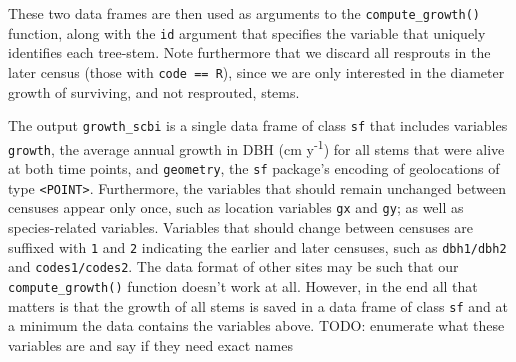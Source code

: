 \documentclass[12pt]{article}
\newenvironment{Shaded}{\begin{snugshade}}{\end{snugshade}}
\newcommand{\CommentTok}[1]{\textcolor[rgb]{0.56,0.35,0.01}{\textit{#1}}}
\newcommand{\DataTypeTok}[1]{\textcolor[rgb]{0.13,0.29,0.53}{#1}}
\newcommand{\DecValTok}[1]{\textcolor[rgb]{0.00,0.00,0.81}{#1}}
\newcommand{\KeywordTok}[1]{\textcolor[rgb]{0.13,0.29,0.53}{\textbf{#1}}}
\newcommand{\NormalTok}[1]{#1}
\newcommand{\OperatorTok}[1]{\textcolor[rgb]{0.81,0.36,0.00}{\textbf{#1}}}
\newcommand{\StringTok}[1]{\textcolor[rgb]{0.31,0.60,0.02}{#1}}
\begin{document}
These two data frames are then used as arguments to the
\texttt{compute\_growth()} function, along with the \texttt{id} argument
that specifies the variable that uniquely identifies each tree-stem.
Note furthermore that we discard all resprouts in the later census
(those with \texttt{code\ ==\ R}), since we are only interested in the
diameter growth of surviving, and not resprouted, stems.

\begin{Shaded}
\end{Shaded}

The output \texttt{growth\_scbi} is a single data frame of class
\texttt{sf} that includes variables \texttt{growth}, the average annual
growth in DBH (cm y\textsuperscript{-1}) for all stems that were alive
at both time points, and \texttt{geometry}, the \texttt{sf} package's
encoding of geolocations of type
\texttt{\textless{}POINT\textgreater{}}. Furthermore, the variables that
should remain unchanged between censuses appear only once, such as
location variables \texttt{gx} and \texttt{gy}; as well as
species-related variables. Variables that should change between censuses
are suffixed with \texttt{1} and \texttt{2} indicating the earlier and
later censuses, such as \texttt{dbh1/dbh2} and \texttt{codes1/codes2}.
The data format of other sites may be such that our
\texttt{compute\_growth()} function doesn't work at all. However, in the
end all that matters is that the growth of all stems is saved in a data
frame of class \texttt{sf} and at a minimum the data contains the
variables above. TODO: enumerate what these variables are and say if
they need exact names
\end{document}
